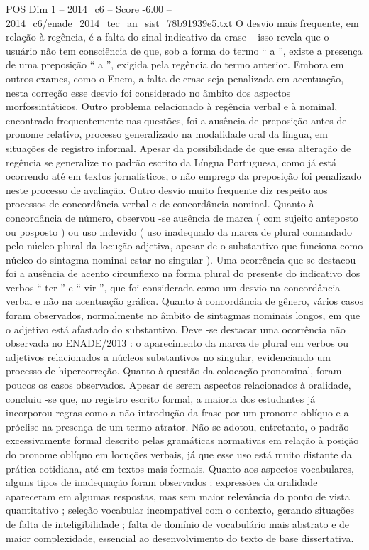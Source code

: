\begin{textsample}{POS Dim 1 – 2014\_c6 – Score -6.00 – 2014\_c6/enade\_2014\_tec\_an\_sist\_78b91939e5.txt}
O desvio mais frequente, em relação à regência, é a falta do sinal indicativo da crase – isso revela que o usuário não tem consciência de que, sob a forma do termo “ a ”, existe a presença de uma preposição “ a ”, exigida pela regência do termo anterior.
Embora em outros exames, como o Enem, a falta de crase seja penalizada em acentuação, nesta correção esse desvio foi considerado no âmbito dos aspectos morfossintáticos.
Outro problema relacionado à regência verbal e à nominal, encontrado frequentemente nas questões, foi a ausência de preposição antes de pronome relativo, processo generalizado na modalidade oral da língua, em situações de registro informal.
Apesar da possibilidade de que essa alteração de regência se generalize no padrão escrito da Língua Portuguesa, como já está ocorrendo até em textos jornalísticos, o não emprego da preposição foi penalizado neste processo de avaliação.
Outro desvio muito frequente diz respeito aos processos de concordância verbal e de concordância nominal.
Quanto à concordância de número, observou -se ausência de marca ( com sujeito anteposto ou posposto ) ou uso indevido ( uso inadequado da marca de plural comandado pelo núcleo plural da locução adjetiva, apesar de o substantivo que funciona como núcleo do sintagma nominal estar no singular ).
Uma ocorrência que se destacou foi a ausência de acento circunflexo na forma plural do presente do indicativo dos verbos “ ter ” e “ vir ”, que foi considerada como um desvio na concordância verbal e não na acentuação gráfica.
Quanto à concordância de gênero, vários casos foram observados, normalmente no âmbito de sintagmas nominais longos, em que o adjetivo está afastado do substantivo.
Deve -se destacar uma ocorrência não observada no ENADE/2013 : o aparecimento da marca de plural em verbos ou adjetivos relacionados a núcleos substantivos no singular, evidenciando um processo de hipercorreção.
Quanto à questão da colocação pronominal, foram poucos os casos observados.
Apesar de serem aspectos relacionados à oralidade, concluiu -se que, no registro escrito formal, a maioria dos estudantes já incorporou regras como a não introdução da frase por um pronome oblíquo e a próclise na presença de um termo atrator.
Não se adotou, entretanto, o padrão excessivamente formal descrito pelas gramáticas normativas em relação à posição do pronome oblíquo em locuções verbais, já que esse uso está muito distante da prática cotidiana, até em textos mais formais.
Quanto aos aspectos vocabulares, alguns tipos de inadequação foram observados : expressões da oralidade apareceram em algumas respostas, mas sem maior relevância do ponto de vista quantitativo ; seleção vocabular incompatível com o contexto, gerando situações de falta de inteligibilidade ; falta de domínio de vocabulário mais abstrato e de maior complexidade, essencial ao desenvolvimento do texto de base dissertativa.

\end{textsample}
